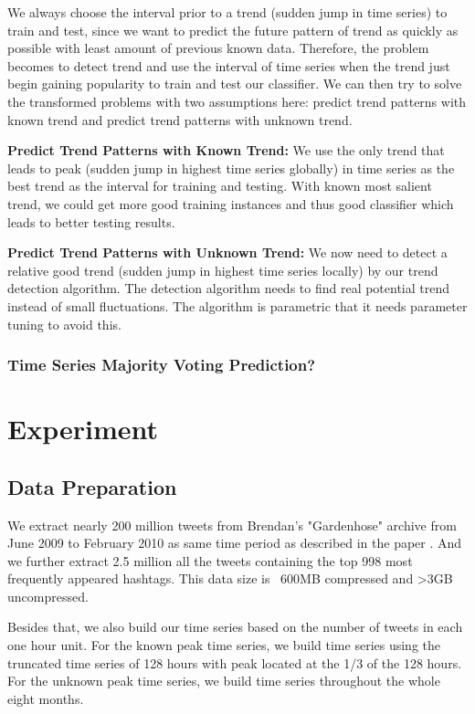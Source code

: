 \documentclass{article}
\begin{document}
We always choose the interval prior to a trend (sudden jump in time series) to train and test, since we want to predict the future pattern of trend as quickly as possible with least amount of previous known data. Therefore, the problem becomes to detect trend and use the interval of time series when the trend just begin gaining popularity to train and test our classifier. We can then try to solve the transformed problems with two assumptions here: predict trend patterns with known trend and predict trend patterns with unknown trend. 

{\bf Predict Trend Patterns with Known Trend:} We use the only trend that leads to peak (sudden jump in highest time series globally) in time series as the best trend as the interval for training and testing. With known most salient trend, we could get more good training instances and thus good classifier which leads to better testing results.

{\bf Predict Trend Patterns with Unknown Trend:} We now need to detect a relative good trend (sudden jump in highest time series locally) by our trend detection algorithm. The detection algorithm needs to find real potential trend instead of small fluctuations. The algorithm is parametric that it needs parameter tuning to avoid this. 


\subsubsection{Time Series Majority Voting Prediction?}



\section{Experiment} 

\subsection{Data Preparation}

We extract nearly 200 million tweets from Brendan's "Gardenhose" archive from June 2009 to February 2010 as same time period as described in the paper \cite{Yang11}. And we further extract 2.5 million all the tweets containing the top 998 most frequently appeared hashtags. This data size is ~600MB compressed and >3GB uncompressed.  

Besides that, we also build our time series based on the number of tweets in each one hour unit. For the known peak time series, we build time series using the truncated time series of 128 hours with peak located at the 1/3 of the 128 hours. For the unknown peak time series, we build time series throughout the whole eight months. 
\end{document}
